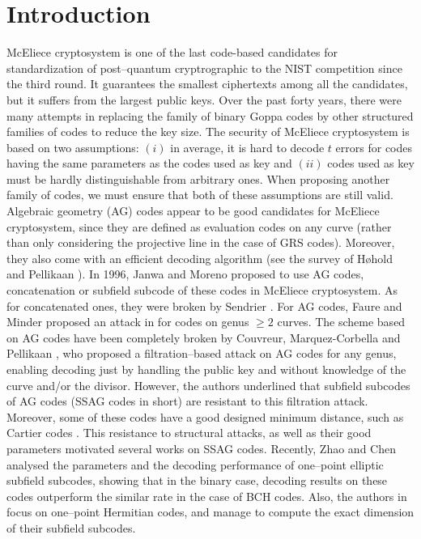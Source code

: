 \documentclass[a4paper]{article}
\theoremstyle{definition}
\theoremstyle{remark}
\begin{document}
\section*{Introduction}
McEliece cryptosystem is one of the last code-based candidates for standardization of post--quantum cryptrographic to the NIST competition since the third round. It guarantees the smallest ciphertexts among all the candidates, but it suffers from the largest public keys. Over the past forty years, there were many attempts in replacing the family of binary Goppa codes by other structured families of codes to reduce the key size.
The security of McEliece cryptosystem is based on two assumptions: $(i)$ in average, it is hard to decode $t$ errors for codes having the same parameters as the codes used as key and $(ii)$ codes used as key must be hardly distinguishable from arbitrary ones. When proposing another family of codes, we must ensure that both of these assumptions are still valid.
Algebraic geometry (AG) codes appear to be good candidates for McEliece cryptosystem, since they are defined as evaluation codes on any curve (rather than only considering the projective line in the case of GRS codes). Moreover, they also come with an efficient decoding algorithm (see the survey of H\o hold and Pellikaan \cite{HP95}).
In 1996, Janwa and Moreno \cite{JM96} proposed to use AG codes, concatenation or subfield subcode of these codes in McEliece cryptosystem. As for concatenated ones, they were broken by Sendrier \cite{Sen94}. For AG codes, Faure and Minder proposed an attack in \cite{FM08,Min07,Fau09} for codes on genus $\geq 2$ curves. The scheme based on AG codes have been completely broken by Couvreur, Marquez-Corbella and Pellikaan \cite{CMR17}, who proposed a filtration--based attack on AG codes for any genus, enabling decoding just by handling the public key and without knowledge of the curve and/or the divisor. However, the authors underlined that subfield subcodes of AG codes (SSAG codes in short) are resistant to this filtration attack. Moreover, some of these codes have a good designed minimum distance, such as Cartier codes \cite{Cou14}. This resistance to structural attacks, as well as their good parameters motivated several works on SSAG codes. Recently, Zhao and Chen \cite{ZC22} analysed the parameters and the decoding performance of one--point elliptic subfield subcodes, showing that in the binary case, decoding results on these codes outperform the similar rate in the case of BCH codes. Also, the authors in \cite{PJ14,EKN21} focus on one--point Hermitian codes, and manage to compute the exact dimension of their subfield subcodes. 
\medskip
\end{document}
